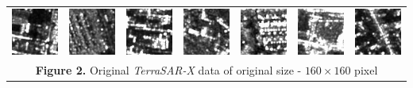 \documentclass{article}
\begin{document}
\begin{table}[t]
\begin{tabular}{ccccccc}
   			\includegraphics[scale=0.64]{Images/real_image_samples/8.png}  &
   			\includegraphics[scale=0.64]{Images/real_image_samples/9.png}  &   			
   			\includegraphics[scale=0.64]{Images/real_image_samples/10.png}  & 
   			\includegraphics[scale=0.64]{Images/real_image_samples/11.png}  & 
   			\includegraphics[scale=0.64]{Images/real_image_samples/12.png}  &
   			\includegraphics[scale=0.64]{Images/real_image_samples/13.png}  &
   			\includegraphics[scale=0.64]{Images/real_image_samples/14.png}  \\
   			
	\multicolumn{7}{c}{\textbf{Figure 2.} Original \emph{TerraSAR-X} data of original size - $160 \times 160$ pixel}
	\end{tabular}
	\label{real-data}
\end{table}
\end{document}
